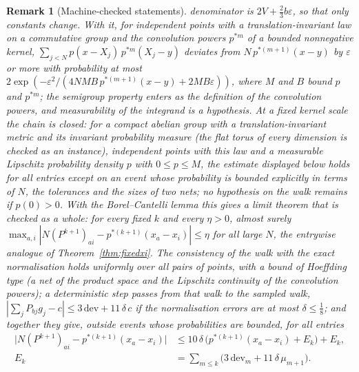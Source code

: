 \documentclass[11pt,a4paper]{article}
\theoremstyle{stmt}
\theoremstyle{defn}
\theoremstyle{rmk}
\newtheorem{remark}[theorem]{Remark}
\numberwithin{equation}{section}
\begin{document}
{\begin{remark}[Machine-checked statements]
denominator is $2V+\frac23b\varepsilon$, so that only constants change. With it, for independent points with a translation-invariant law on a commutative group and the convolution powers $p^{*m}$ of a bounded nonnegative kernel, $\sum_{j<N}p(x-X_j)\,p^{*m}(X_j-y)$ deviates from $N\,p^{*(m+1)}(x-y)$ by $\varepsilon$ or more with probability at most $2\exp(-\varepsilon^2/(4NMB\,p^{*(m+1)}(x-y)+2MB\varepsilon))$, where $M$ and $B$ bound $p$ and $p^{*m}$; the semigroup property enters as the definition of the convolution powers, and measurability of the integrand is a hypothesis. At a fixed kernel scale the chain is closed: for a compact abelian group with a translation-invariant metric and its invariant probability measure (the flat torus of every dimension is checked as an instance), independent points with this law and a measurable Lipschitz probability density $p$ with $0\le p\le M$, the estimate displayed below holds for all entries except on an event whose probability is bounded explicitly in terms of $N$, the tolerances and the sizes of two nets; no hypothesis on the walk remains if $p(0)>0$. With the Borel--Cantelli lemma this gives a limit theorem that is checked as a whole: for every fixed $k$ and every $\eta>0$, almost surely $\max_{a,i}|N(P^{k+1})_{ai}-p^{*(k+1)}(x_a-x_i)|\le\eta$ for all large $N$, the entrywise analogue of Theorem~\ref{thm:fixedxi}. The consistency of the walk with the exact normalisation holds uniformly over all pairs of points, with a bound of Hoeffding type (a net of the product space and the Lipschitz continuity of the convolution powers); a deterministic step passes from that walk to the sampled walk, $|\sum_jP_{bj}g_j-c|\le3\,\mathrm{dev}+11\,\delta\,c$ if the normalisation errors are at most $\delta\le\frac18$; and together they give, outside events whose probabilities are bounded, for all entries
\[
\begin{aligned}
\big|N(P^{k+1})_{ai}-p^{*(k+1)}(x_a-x_i)\big|&\le10\,\delta\,\big(p^{*(k+1)}(x_a-x_i)+E_k\big)+E_k,\\
E_k&=\sum_{m\le k}\big(3\,\mathrm{dev}_m+11\,\delta\,\mu_{m+1}\big).
\end{aligned}
\]

\end{remark}}
\end{document}
